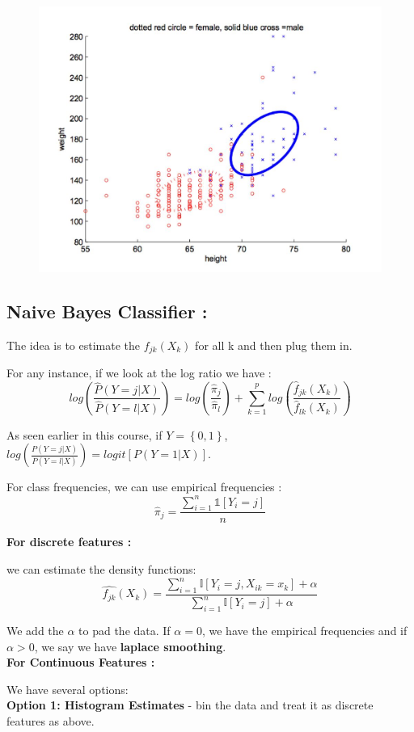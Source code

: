 \documentclass[11pt]{report}
\begin{document}
\begin{figure}[ht]
    \centering
    \includegraphics[width=0.5\linewidth]{image_2.JPG}
    \captionsetup{labelformat=empty}
\end{figure}


\subsection{Naive Bayes Classifier :} 
The idea is to estimate the $f_{jk}(X_k)$ for all k and then plug them in. 

For any instance, if we look at the log ratio we have : 
\[log \left(\frac{\hat{P}(Y=j|X)}{\hat{P}(Y=l|X)}\right) = log \left( \frac{\hat{\pi}_j}{\hat{\pi}_l}\right)+\sum\limits_{k=1}^p log \left(\frac{\hat{f}_{jk}(X_k)}{\hat{f}_{lk}(X_k)} \right)\]

As seen earlier in this course, if $Y=\left\{0 , 1\right\}$, $log \left(\frac{P(Y=j|X)}{P(Y=l|X)}\right) = logit\left[P(Y=1|X)\right]$.

For class frequencies, we can use empirical frequencies :
\[\hat{\pi}_j=\frac{\sum\limits_{i=1}^n \mathds{1}\left[Y_i=j\right] }{n}\]

\textbf{For discrete features :}

we can estimate the density functions:
\[\hat{f_{jk}}{(X_k)}=\frac{\sum\limits_{i=1}^n \mathbb{I}\left[Y_i=j , X_{ik}=x_k \right] +\alpha}{\sum\limits_{i=1}^n \mathbb{I}\left[Y_i=j\right] +\alpha}\]

We add the $\alpha$ to pad the data. If $\alpha=0$, we have the empirical frequencies and if $\alpha > 0$, we say we have \textbf{laplace smoothing}.\\


\textbf{For Continuous Features : }

We have several options: \\

\textbf{Option 1: Histogram Estimates} - bin the data and treat it as discrete features as above.\\
\end{document}
